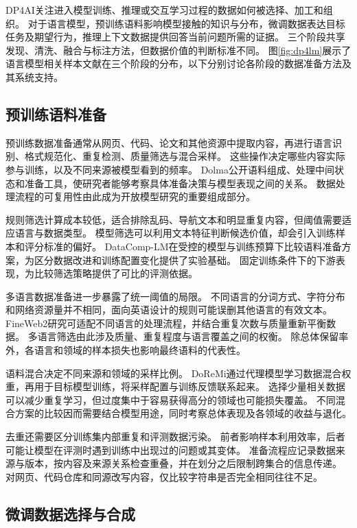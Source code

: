 DP4AI关注进入模型训练、推理或交互学习过程的数据如何被选择、加工和组织。
对于语言模型，预训练语料影响模型接触的知识与分布，微调数据表达目标任务及期望行为，推理上下文数据提供回答当前问题所需的证据。
三个阶段共享发现、清洗、融合与标注方法，但数据价值的判断标准不同。
图\ref{fig:dp4lm}展示了语言模型相关样本文献在三个阶段的分布，以下分别讨论各阶段的数据准备方法及其系统支持。


\subsection{预训练语料准备}

预训练数据准备通常从网页、代码、论文和其他资源中提取内容，再进行语言识别、格式规范化、重复检测、质量筛选与混合采样。
这些操作决定哪些内容实际参与训练，以及不同来源被模型看到的频率。
Dolma公开语料组成、处理中间状态和准备工具，使研究者能够考察具体准备决策与模型表现之间的关系。\cite{dolma}
数据处理流程的可复用性由此成为开放模型研究的重要组成部分。

规则筛选计算成本较低，适合排除乱码、导航文本和明显重复内容，但阈值需要适应语言与数据类型。
模型筛选可以利用文本特征判断候选价值，却会引入训练样本和评分标准的偏好。
DataComp-LM在受控的模型与训练预算下比较语料准备方案，为区分数据改进和训练配置变化提供了实验基础。\cite{dclm}
固定训练条件下的下游表现，为比较筛选策略提供了可比的评测依据。

多语言数据准备进一步暴露了统一阈值的局限。
不同语言的分词方式、字符分布和网络资源量并不相同，面向英语设计的规则可能误删其他语言的有效文本。
FineWeb2研究可适配不同语言的处理流程，并结合重复次数与质量重新平衡数据。\cite{fineweb2}
多语言筛选由此涉及质量、重复程度与语言覆盖之间的权衡。
除总体保留率外，各语言和领域的样本损失也影响最终语料的代表性。

语料混合决定不同来源和领域的采样比例。
DoReMi通过代理模型学习数据混合权重，再用于目标模型训练，将采样配置与训练反馈联系起来。\cite{doremi}
选择少量相关数据可以减少重复学习，但过度集中于容易获得高分的领域也可能损失覆盖。
不同混合方案的比较因而需要结合模型用途，同时考察总体表现及各领域的收益与退化。

去重还需要区分训练集内部重复和评测数据污染。
前者影响样本利用效率，后者可能让模型在评测时遇到训练中出现过的问题或其变体。
准备流程应记录数据来源与版本，按内容及来源关系检查重叠，并在划分之后限制跨集合的信息传递。
对网页、代码仓库和同源改写内容，仅比较字符串是否完全相同往往不足。

\subsection{微调数据选择与合成}

